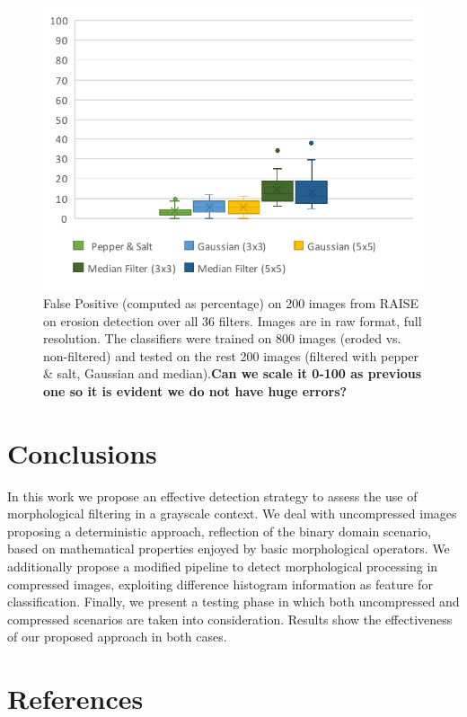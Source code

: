 \documentclass[review]{elsarticle}
\begin{document}
\begin{figure}[h!]
	\centering
	\includegraphics[width=0.7\linewidth]{different_filters.pdf}
	\caption{False Positive (computed as percentage) on 200 images from RAISE on erosion detection over all 36 filters. Images are in raw format, full resolution. The classifiers were trained on 800 images (eroded vs. non-filtered) and tested on the rest 200 images (filtered with pepper \& salt, Gaussian and median).\textbf{Can we scale it 0-100 as previous one so it is evident we do not have huge errors?}}
	\label{fig:different_filters}
\end{figure}


\section{Conclusions}
\label{sec:conclusions}
In this work we propose an effective detection strategy to assess the use of morphological filtering in a grayscale context. We deal with uncompressed images proposing a deterministic approach, reflection of the binary domain scenario, based on mathematical properties enjoyed by basic morphological operators. We additionally propose a modified pipeline to detect morphological processing in compressed images, exploiting difference histogram information as feature for  classification. Finally, we present a testing phase in which both uncompressed and compressed scenarios are taken into consideration. Results show the effectiveness of our proposed approach in both cases.  
 

\section*{References}

\end{document}
